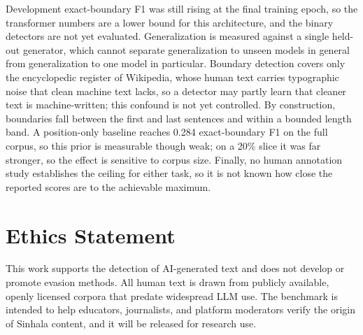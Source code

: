 \documentclass[11pt]{article}
\begin{document}
Development exact-boundary F1 was still rising at the final training epoch, so the transformer numbers are a lower bound for this architecture, and the binary detectors are not yet evaluated. Generalization is measured against a single held-out generator, which cannot separate generalization to unseen models in general from generalization to one model in particular. Boundary detection covers only the encyclopedic register of Wikipedia, whose human text carries typographic noise that clean machine text lacks, so a detector may partly learn that cleaner text is machine-written; this confound is not yet controlled. By construction, boundaries fall between the first and last sentences and within a bounded length band. A position-only baseline reaches 0.284 exact-boundary F1 on the full corpus, so this prior is measurable though weak; on a 20\% slice it was far stronger, so the effect is sensitive to corpus size. Finally, no human annotation study establishes the ceiling for either task, so it is not known how close the reported scores are to the achievable maximum.

\section*{Ethics Statement}

This work supports the detection of AI-generated text and does not develop or promote evasion methods. All human text is drawn from publicly available, openly licensed corpora that predate widespread LLM use. The benchmark is intended to help educators, journalists, and platform moderators verify the origin of Sinhala content, and it will be released for research use.



\appendix


\end{document}
